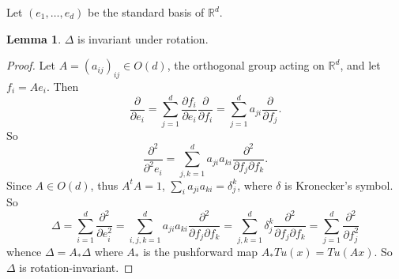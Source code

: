\documentclass[10pt]{article}
\newcommand{\RR}{\mathbb{R}}
\theoremstyle{definition}
\newtheorem{lemma}{Lemma}[exer]
\begin{document}
Let $(e_1, \dots, e_d)$ be the standard basis of $\RR^d$.
\begin{lemma}
\label{rotation invariant}
$\Delta$ is invariant under rotation.
\end{lemma}
\begin{proof}
Let $A = (a_{ij})_{ij} \in O(d)$, the orthogonal group acting on $\RR^d$, and let $f_i = Ae_i$. Then
$$\frac{\partial}{\partial e_i} = \sum_{j=1}^d \frac{\partial f_i}{\partial e_i}\frac{\partial}{\partial f_i} = \sum_{j=1}^d a_{ji} \frac{\partial}{\partial f_j}.$$
So
$$\frac{\partial^2}{\partial^2 e_i} = \sum_{j,k=1}^d a_{ji} a_{ki} \frac{\partial^2}{\partial f_j \partial f_k}.$$
Since $A \in O(d)$, thus $A^t A = 1$, $\sum_i a_{ji} a_{ki} = \delta_j^k$, where $\delta$ is Kronecker's symbol.
So
$$\Delta = \sum_{i=1}^d \frac{\partial^2}{\partial e_i^2} = \sum_{i,j,k=1}^d a_{ji} a_{ki} \frac{\partial^2}{\partial f_j \partial f_k} = \sum_{j,k=1}^d \delta_j^k \frac{\partial^2}{\partial f_j \partial f_k} = \sum_{j=1}^d \frac{\partial^2}{\partial f_j^2}$$
whence $\Delta = A_*\Delta$ where $A_*$ is the pushforward map $A_*Tu(x) = Tu(Ax)$. So $\Delta$ is rotation-invariant.
\end{proof}
\end{document}
